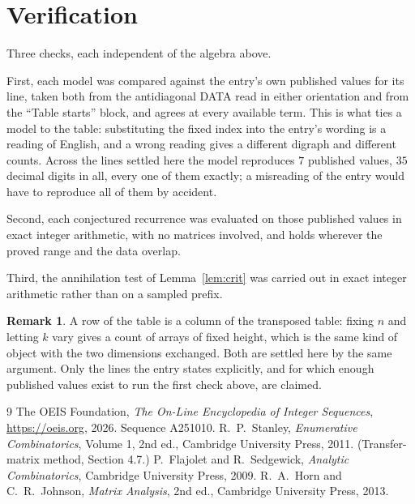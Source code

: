 \documentclass[11pt,a4paper]{article}
\theoremstyle{plain}
\theoremstyle{definition}
\newtheorem{remark}[theorem]{Remark}
\begin{document}
\section{Verification}

Three checks, each independent of the algebra above.

First, each model was compared against the entry's own published values for its line, taken
both from the antidiagonal DATA read in either orientation and from the ``Table starts''
block, and agrees at every available term. This is what ties a model to the table:
substituting the fixed index into the entry's wording is a reading of English, and a wrong
reading gives a different digraph and different counts. Across the lines settled here the
model reproduces $7$ published values, $35$ decimal digits in all, every one of
them exactly; a misreading of the entry would have to reproduce all of them by accident.

Second, each conjectured recurrence was evaluated on those published values in exact
integer arithmetic, with no matrices involved, and holds wherever the proved range and the
data overlap.

Third, the annihilation test of Lemma~\ref{lem:crit} was carried out in exact integer
arithmetic rather than on a sampled prefix.

\begin{remark}
A row of the table is a column of the transposed table: fixing $n$ and letting $k$ vary gives a
count of arrays of fixed height, which is the same kind of object with the two dimensions
exchanged. Both are settled here by the same argument. Only the lines the entry states
explicitly, and for which enough published values exist to run the first check above, are
claimed.
\end{remark}

\begin{thebibliography}{9}
 The OEIS Foundation, \emph{The On-Line Encyclopedia of Integer
Sequences}, \url{https://oeis.org}, 2026. Sequence A251010.
 R.~P.~Stanley, \emph{Enumerative Combinatorics}, Volume 1, 2nd ed.,
Cambridge University Press, 2011. (Transfer-matrix method, Section 4.7.)
 P.~Flajolet and R.~Sedgewick, \emph{Analytic Combinatorics}, Cambridge
University Press, 2009.
 R.~A.~Horn and C.~R.~Johnson, \emph{Matrix Analysis}, 2nd ed., Cambridge
University Press, 2013.
\end{thebibliography}
\end{document}
